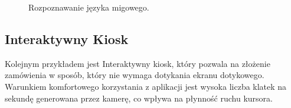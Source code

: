 \begin{figure}[H]
    \centering
    \hfill
    \hfill
    \caption{Rozpoznawanie języka migowego.}
\end{figure}

\subsection{Interaktywny Kiosk}
\quad Kolejnym przykładem jest Interaktywny kiosk, który pozwala na złożenie zamówienia w sposób, który nie wymaga dotykania ekranu dotykowego. Warunkiem komfortowego korzystania z aplikacji jest wysoka liczba klatek na sekundę generowana przez kamerę, co wpływa na płynność ruchu kursora. 

